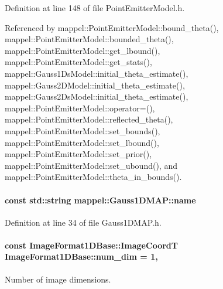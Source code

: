 Definition at line 148 of file Point\+Emitter\+Model.\+h.



Referenced by mappel\+::\+Point\+Emitter\+Model\+::bound\+\_\+theta(), mappel\+::\+Point\+Emitter\+Model\+::bounded\+\_\+theta(), mappel\+::\+Point\+Emitter\+Model\+::get\+\_\+lbound(), mappel\+::\+Point\+Emitter\+Model\+::get\+\_\+stats(), mappel\+::\+Gauss1\+Ds\+Model\+::initial\+\_\+theta\+\_\+estimate(), mappel\+::\+Gauss2\+D\+Model\+::initial\+\_\+theta\+\_\+estimate(), mappel\+::\+Gauss2\+Ds\+Model\+::initial\+\_\+theta\+\_\+estimate(), mappel\+::\+Point\+Emitter\+Model\+::operator=(), mappel\+::\+Point\+Emitter\+Model\+::reflected\+\_\+theta(), mappel\+::\+Point\+Emitter\+Model\+::set\+\_\+bounds(), mappel\+::\+Point\+Emitter\+Model\+::set\+\_\+lbound(), mappel\+::\+Point\+Emitter\+Model\+::set\+\_\+prior(), mappel\+::\+Point\+Emitter\+Model\+::set\+\_\+ubound(), and mappel\+::\+Point\+Emitter\+Model\+::theta\+\_\+in\+\_\+bounds().

\paragraph[{\texorpdfstring{name}{name}}]{\setlength{\rightskip}{0pt plus 5cm}const std\+::string mappel\+::\+Gauss1\+D\+M\+A\+P\+::name\hspace{0.3cm}{\ttfamily [static]}}\hypertarget{classmappel_1_1Gauss1DMAP_ad6f9d453eec86b3d002909112cbe4b2c}{}\label{classmappel_1_1Gauss1DMAP_ad6f9d453eec86b3d002909112cbe4b2c}


Definition at line 34 of file Gauss1\+D\+M\+A\+P.\+h.

\paragraph[{\texorpdfstring{num\+\_\+dim}{num_dim}}]{\setlength{\rightskip}{0pt plus 5cm}const {\bf Image\+Format1\+D\+Base\+::\+Image\+CoordT} Image\+Format1\+D\+Base\+::num\+\_\+dim = 1\hspace{0.3cm}{\ttfamily [static]}, {\ttfamily [inherited]}}\hypertarget{classmappel_1_1ImageFormat1DBase_af81159de9010c3618d2f69349c1f2368}{}\label{classmappel_1_1ImageFormat1DBase_af81159de9010c3618d2f69349c1f2368}
Number of image dimensions. 

